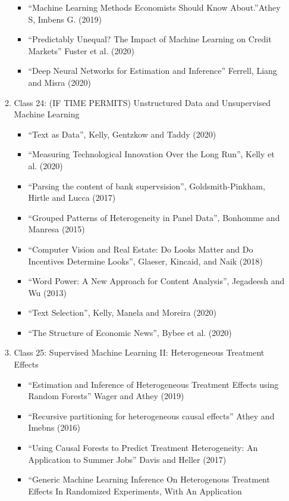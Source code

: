\documentclass[11pt, a4paper]{article}
\begin{document}
\begin{enumerate}
\begin{enumerate}
    \begin{itemize}
    \item ``Machine Learning Methods Economists Should Know About.''Athey S, Imbens G.  (2019)
    \item ``Predictably Unequal? The Impact of Machine Learning on Credit Markets'' Fuster et al. (2020)
    \item ``Deep Neural Networks for Estimation and Inference'' Ferrell, Liang and Misra (2020)
    \end{itemize}
  \item Class 24: (IF TIME PERMITS) Unstructured Data and Unsupervised Machine Learning 
    \begin{itemize}
    \item ``Text as Data'', Kelly, Gentzkow and Taddy (2020)
    \item ``Measuring Technological Innovation Over the Long Run'', Kelly et al. (2020)
    \item ``Parsing the content of bank supervsision'', Goldsmith-Pinkham, Hirtle and Lucca (2017)
    \item ``Grouped Patterns of Heterogeneity in Panel Data'', Bonhomme and Manresa (2015)
    \item ``Computer Vision and Real Estate: Do Looks Matter and Do Incentives Determine Looks'', Glaeser, Kincaid, and Naik (2018)
    \item ``Word Power: A New Approach for Content Analysis'', Jegadeesh and Wu (2013)
    \item ``Text Selection'', Kelly, Manela and Moreira (2020)
    \item ``The Structure of Economic News'', Bybee et al. (2020)
    \end{itemize}
  \item Class 25: Supervised Machine Learning II: Heterogeneous Treatment Effects
    \begin{itemize}
    \item ``Estimation and Inference of Heterogeneous Treatment Effects using Random Forests'' Wager and Athey (2019)
    \item ``Recursive partitioning for heterogeneous causal effects'' Athey and Imebns (2016)
    \item ``Using Causal Forests to Predict Treatment Heterogeneity:  An Application to Summer Jobs'' Davis and Heller (2017)
    \item ``Generic Machine Learning Inference On Heterogenous
      Treatment Effects In Randomized Experiments, With An Application

\end{itemize}
\end{enumerate}
\end{enumerate}
\end{document}
